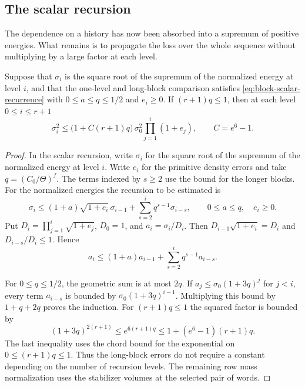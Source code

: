 \subsection{The scalar recursion}



The dependence on a history has now been absorbed into a supremum of positive energies. What remains is to propagate the loss over the whole sequence without multiplying by a large factor at each level.

\begin{proposition}\label{prop:accumulated-density-loss}
Suppose that \(\sigma_i\) is the square root of the supremum
of the normalized energy at level \(i\), and that the one-level
and long-block comparison satisfies \eqref{eq:block-scalar-recurrence} with
\(0\le a\le q\le 1/2\) and \(e_i\ge0\).
If \((r+1)q\le1\), then at each level \(0\le i\le r+1\) 
\[
 \sigma_i^2\le\bigl(1+C(r+1)q\bigr)\,\sigma_0^2\prod_{j=1}^i(1+e_j),\qquad C=e^6-1.
\]

\end{proposition}

\begin{proof}
In the scalar recursion, write \(\sigma_i\) for the square
root of the supremum of the normalized energy at level \(i\).
Write \(e_i\) for the primitive density errors and take
\(q=(C_0/\Theta)^f\). The terms indexed by \(s\ge2\) use
the bound for the longer blocks.
For the normalized energies the recursion to be estimated is
\begin{equation}\label{eq:block-scalar-recurrence}
 \sigma_i\le (1+a)\sqrt{1+e_i}\,\sigma_{i-1}
       +\sum_{s=2}^i q^{s-1}\sigma_{i-s},
 \qquad 0\le a\le q,\quad e_i\ge0 .
\end{equation}
Put \(D_i=\prod_{j=1}^i\sqrt{1+e_j}\), \(D_0=1\),
and \(a_i=\sigma_i/D_i\). Then \(D_{i-1}\sqrt{1+e_i}=D_i\)
and \(D_{i-s}/D_i\le1\). Hence
\[
 a_i\le(1+a)a_{i-1}+\sum_{s=2}^i q^{s-1}a_{i-s}.
\]

For \(0\le q\le1/2\), the geometric sum is at most \(2q\).
If \(a_j\le \sigma_0(1+3q)^j\) for \(j<i\), every term
\(a_{i-s}\) is bounded by \(\sigma_0(1+3q)^{i-1}\).
Multiplying this bound by \(1+q+2q\) proves the induction.
For \((r+1)q\le1\) the squared factor is bounded by
\[
 (1+3q)^{2(r+1)}\le e^{6(r+1)q}
 \le 1+(e^6-1)(r+1)q .
\]
The last inequality uses the chord bound for the exponential
on \(0\le(r+1)q\le1\). Thus the long-block
errors do not require a constant depending on the number
of recursion levels. The remaining row mass normalization
uses the stabilizer volumes at the selected pair of words.
\end{proof}

